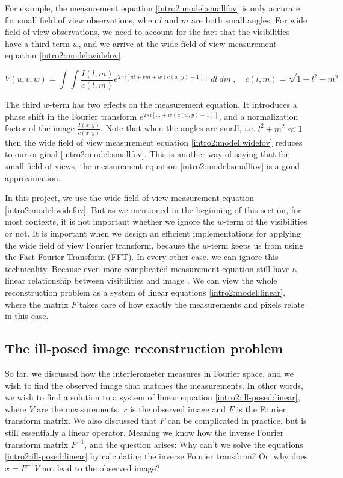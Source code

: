 For example, the measurement equation \eqref{intro2:model:smallfov} is only accurate for small field of view observations, when $l$ and $m$ are both small angles. For wide field of view observations, we need to account for the fact that the visibilities have a third term $w$, and we arrive at the wide field of view measurement equation \eqref{intro2:model:widefov}.
 
\begin{equation}\label{intro2:model:widefov}
 V(u, v, w) = \int\int  \frac{I(l, m)}{c(l, m)}  e^{2 \pi i [ul+vm+ w(c(x, y) - 1)]} \: dl \: dm \:,  \quad c(l,m) = \sqrt{1 - l^2 - m ^2}
\end{equation}
 
The third $w$-term has two effects on the measurement equation. It introduces a phase shift in the Fourier transform $e^{2 \pi i [\ldots +w(c(x, y) - 1)]}$, and a normalization factor of the image $\frac{I(x, y)}{c(x, y)}$. Note that when the angles are small, i.e. $l^2 +m^2 \ll 1$ then the wide field of view measurement equation \eqref{intro2:model:widefov} reduces to our original \eqref{intro2:model:smallfov}. This is another way of saying that for small field of views, the measurement equation \eqref{intro2:model:smallfov} is a good approximation. 

In this project, we use the wide field of view measurement equation \eqref{intro2:model:widefov}. But as we mentioned in the beginning of this section, for most contexts, it is not important whether we ignore the $w$-term of the visibilities or not. It is important when we design an efficient implementations for applying the wide field of view Fourier transform, because the $w$-term keeps us from using the Fast Fourier Transform (FFT). In every other case, we can ignore this technicality. Because even more complicated measurement equation still have a linear relationship between visibilities and image \cite{smirnov2011revisiting1, smirnov2011revisiting2, smirnov2011revisiting3, smirnov2011revisiting4}. We can view the whole reconstruction problem as a system of linear equations \eqref{intro2:model:linear}, where the matrix $F$ takes care of how exactly the measurements and pixels relate in this case.

\subsection{The ill-posed image reconstruction problem}\label{intro2:ill-posed}
So far, we discussed how the interferometer measures in Fourier space, and we wish to find the observed image that matches the measurements. In other words, we wish to find a solution to a system of linear equation \eqref{intro2:ill-posed:linear}, where $V$ are the measurements, $x$ is the observed image and $F$ is the Fourier transform matrix. We also discussed that $F$ can be complicated in practice, but is still essentially a linear operator. Meaning we know how the inverse Fourier transform matrix $F^{-1}$, and the question arises: Why can't we solve the equations \eqref{intro2:ill-posed:linear} by calculating the inverse Fourier transform? Or, why does $x = F^{-1} V$ not lead to the observed image?

